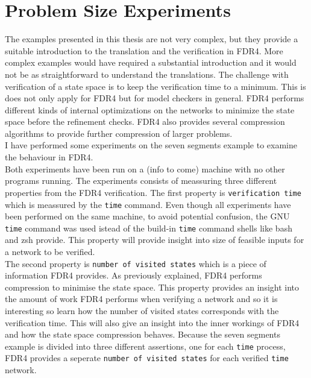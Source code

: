 \section{Problem Size Experiments}
The examples presented in this thesis are not very complex, but they provide a suitable introduction to the translation and the verification in FDR4. More complex examples would have required a substantial introduction and it would not be as straightforward to understand the translations. The challenge with verification of a state space is to keep the verification time to a minimum. This is does not only apply for FDR4 but for model checkers in general. FDR4 performs different kinds of internal optimizations on the networks to minimize the state space before the refinement checks. FDR4 also provides several compression algorithms to provide further compression of larger problems. \\

I have performed some experiments on the seven segments example to examine the behaviour in FDR4.\\
Both experiments have been run on a (info to come) machine with no other programs running. The experiments consists of meassuring three different properties from the FDR4 verification. The first property is \texttt{verification time} which is meassured by the \texttt{time} command. Even though all experiments have been performed on the same machine, to avoid potential confusion, the GNU \texttt{time} command was used istead of the build-in \texttt{time} command shells like bash and zsh provide. This property will provide insight into size of feasible inputs for a \cspm{} network to be verified.\\

The second property is \texttt{number of visited states} which is a piece of information FDR4 provides.
As previously explained, FDR4 performs compression to minimise the state space.
This property provides an insight into the amount of work FDR4 performs when verifying a network and so it is interesting so learn how the number of visited states corresponds with the verification time. This will also give an insight into the inner workings of FDR4 and how the state space compression behaves.
Because the seven segments example is divided into three different assertions, one for each \texttt{time} process, FDR4 provides a seperate \texttt{number of visited states} for each verified \texttt{time} network. \\

